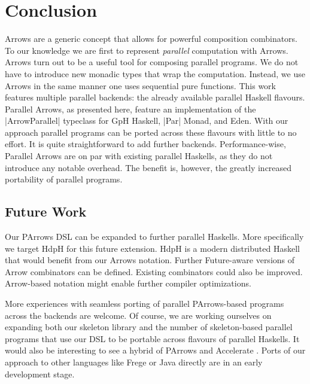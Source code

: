 
\section{Conclusion}
\label{sec:conclusion}
Arrows are a generic concept that allows for powerful composition
combinators. To our knowledge we are first to represent
\emph{parallel} computation with Arrows.
%
Arrows turn out to be a useful tool for composing parallel
programs. We do not have to introduce new monadic types that wrap the
computation. Instead, we use Arrows in the same manner one uses sequential pure functions. 
%
This work features multiple parallel backends: the already available parallel Haskell flavours. Parallel Arrows, as presented here, feature an implementation of the |ArrowParallel| typeclass for GpH Haskell, |Par| Monad, and Eden. With our approach parallel programs can be ported across these flavours with little to no effort. It is quite straightforward to add further backends. 
%
%
Performance-wise, Parallel Arrows are on par with existing parallel Haskells, as they do not introduce any notable overhead.
%
The benefit is, however, the greatly increased portability of parallel programs.



\subsection{Future Work}
\label{sec:future-work}

Our PArrows DSL can be expanded to further parallel Haskells. More specifically we target HdpH \cite{Maier:2014:HDS:2775050.2633363} for this future extension. HdpH is a modern distributed Haskell that would benefit from our Arrows notation. Further Future-aware versions of Arrow combinators can be defined. Existing combinators could also be improved.
Arrow-based notation might enable further compiler optimizations.

More experiences with seamless porting of parallel PArrows-based programs across the backends are welcome.
Of course, we are working ourselves on expanding both our skeleton library and the number of skeleton-based parallel programs that use our DSL to be portable across flavours of parallel Haskells.
It would also be interesting to see a hybrid of PArrows and Accelerate \cite{McDonell:2015:TRC:2887747.2804313}.
Ports of our approach to other languages like Frege or Java directly are in an early development stage.
